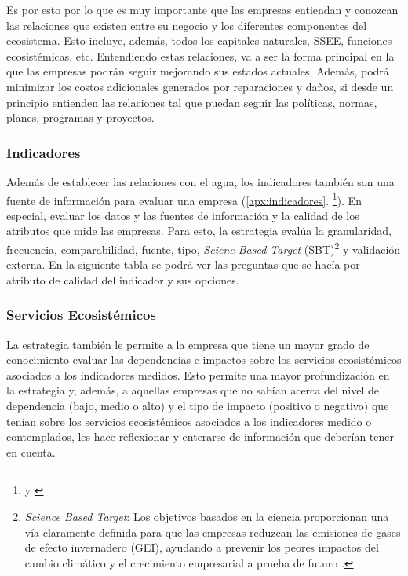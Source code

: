 \hfill
\par
\leftskip=0in \rightskip=0in
Es por esto por lo que es muy importante que las empresas entiendan y conozcan las relaciones que existen entre su negocio y los diferentes componentes del ecosistema. Esto incluye, además, todos los capitales naturales, SSEE, funciones ecosistémicas, etc. Entendiendo estas relaciones, va a ser la forma principal en la que las empresas podrán seguir mejorando sus estados actuales. Además, podrá minimizar los costos adicionales generados por reparaciones y daños, si desde un principio entienden las relaciones tal que puedan seguir las políticas, normas, planes, programas y proyectos. 

\subsubsection{Indicadores}
Además de establecer las relaciones con el agua, los indicadores también son una fuente de información para evaluar una empresa (\ref{apx:indicadores}.  \footnote{\parencite{instituto-de-hidrologia-meteorologia-y-estudios-ambientales-no-date} y \parencite{european-environment-agency-2003}}). En especial, evaluar los datos y las fuentes de información y la calidad de los atributos que mide las empresas. Para esto, la estrategia evalúa la granularidad, frecuencia, comparabilidad, fuente, tipo, \textit{Sciene Based Target} (SBT)\footnote{\textit{Science Based Target}: Los objetivos basados en la ciencia proporcionan una vía claramente definida para que las empresas reduzcan las emisiones de gases de efecto invernadero (GEI), ayudando a prevenir los peores impactos del cambio climático y el crecimiento empresarial a prueba de futuro \parencite{science-based-targets-no-date}.} y validación externa. En la siguiente tabla se podrá ver las preguntas que se hacía por atributo de calidad del indicador y sus opciones.



\subsubsection{Servicios Ecosistémicos}
La estrategia también le permite a la empresa que tiene un mayor grado de conocimiento evaluar las dependencias e impactos sobre los servicios ecosistémicos asociados a los indicadores medidos. Esto permite una mayor profundización en la estrategia y, además, a aquellas empresas que no sabían acerca del nivel de dependencia (bajo, medio o alto) y el tipo de impacto (positivo o negativo) que tenían sobre los servicios ecosistémicos asociados a los indicadores medido o contemplados, les hace reflexionar y enterarse de información que deberían tener en cuenta. 


